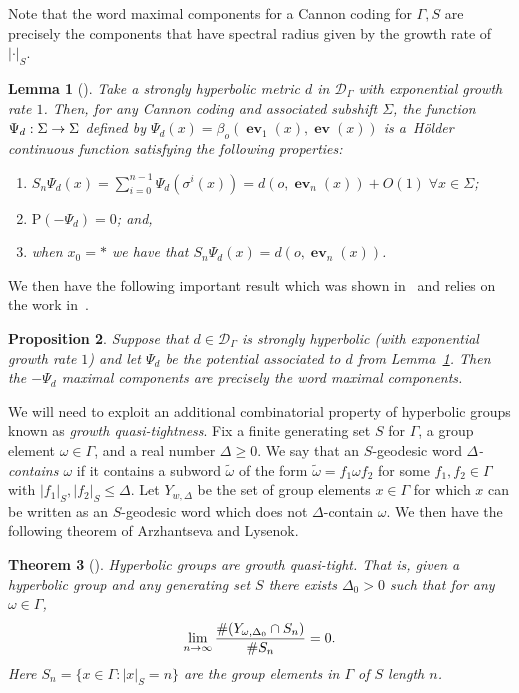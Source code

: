 \documentclass[10pt]{amsart}
\newtheorem{theo}{Theorem}[section]
\newtheorem{lemm}[theo]{Lemma}\newtheorem{prop}[theo]{Proposition}\newtheorem{coro}[theo]{Corollary}\newtheorem{conj}[theo]{Conjecture}
\theoremstyle{definition}\newtheorem{defi}[theo]{Definition}\newtheorem{rema}[theo]{Remark}\newtheorem{exam}[theo]{Example}\newtheorem{exem}[theo]{Example}\newtheorem{nota}[theo]{Notation}
\newcommand{\G}{\Gamma}
\newcommand{\D}{\Delta}
\renewcommand{\o}{\omega}
\newcommand{\s}{\sigma}
\renewcommand{\SS}{\Sigma}
\renewcommand{\P}{\Psi}
\newcommand{\Dc}{\mathcal{D}}
\newcommand*\rmP{\mathrm{P}}
\DeclareMathOperator{\ev}{\mathbf{ev}}
\let\originalleft\left
\let\originalright\right
\renewcommand{\left}{\mathopen{}\mathclose\bgroup\originalleft}
\renewcommand{\right}{\aftergroup\egroup\originalright}
\renewcommand*{\to}{\mathchoice{\longrightarrow}{\rightarrow}{\rightarrow}{\rightarrow}}
\theoremstyle{plain}
\let\oldforall\forall
\renewcommand*{\forall}{\mathrel{\oldforall}}
\begin{document}
Note that the word maximal components for a Cannon coding for $\G,S$ are precisely the components that have spectral radius given by the growth rate of $|\cdot|_S$.
\begin{lemm}[{\cite[Lemma~4.8]{cantrell.tanaka.1}}]\label{lem.holder}
Take a strongly hyperbolic metric $d$ in $\Dc_\G$ with exponential growth rate $ 1$. Then, for any Cannon coding and associated subshift $\SS$, the function $\P_d : \Sigma \to \Sigma$ defined by $\P_d(x) = \beta_o(\ev_1(x),\ev(x))$ is a~H\"older continuous function satisfying the following properties:
\begin{enumerate}
\item\label{lemm2.13.1} $S_n\P_d(x)=\sum_{i=0}^{n-1}\P_d(\s^i(x))= d(o, \ev_n(x))+O(1)\;\forall x \in \SS$;
\item\label{lemm2.13.2} $\rmP(-\P_d) = 0$; and,
\item\label{lemm2.13.3} when $x_0 = \ast$ we have that $S_n\P_d(x) = d(o,\ev_n(x))$.
\end{enumerate}
\end{lemm}

We then have the following important result which was shown in~\cite{cantrell} and relies on the work in~\cite{cantrell.tanaka.2}.

\begin{prop}\label{prop.mc}
Suppose that $d \in \Dc_\G$ is strongly hyperbolic (with exponential growth rate $1$) and let $\P_d$ be the potential associated to $d$ from Lemma~\ref{lem.holder}. Then the $-\Psi_d$ maximal components are precisely the word maximal components.
\end{prop}

We will need to exploit an additional combinatorial property of hyperbolic groups known as \emph{growth quasi-tightness}. Fix a finite generating set $S$ for $\G$, a group element $\o \in \G$, and a real number $\D \ge 0$. We say that an $S$-geodesic word \emph{$\D$-contains $\o$} if it contains a subword $\widetilde{\o}$ of the form $\widetilde{\o} = f_1\o f_2$ for some $f_1, f_2 \in \Gamma$ with $|f_1|_S, |f_2|_S \le \D$. Let $Y_{w,\D}$ be the set of group elements $x \in \G$ for which $x$ can be written as an $S$-geodesic word which does not $\D$-contain $\o$. We then have the following theorem of Arzhantseva and Lysenok.

\begin{theo}[{\cite[Theorem~3]{arzlys}}]
Hyperbolic groups are growth quasi-tight. That is, given a hyperbolic group and any generating set $S$ there exists $\D_0> 0$ such that for any $\o \in \Gamma$,
\[
\lim_{n\to \infty} \frac{\#\left(Y_{\o,\D_0} \cap S_n\right)}{\#S_n}=0.
\]
Here $S_n = \{ x \in \G: |x|_S = n\}$ are the group elements in $\G$ of $S$ length $n$.
\end{theo}
\end{document}
